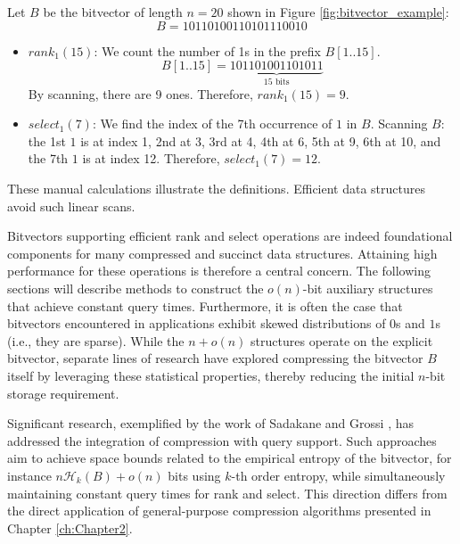 \begin{example}
    Let $B$ be the bitvector of length $n=20$ shown in Figure \ref{fig:bitvector_example}:
    \[ B = 10110100110101110010 \]

    \begin{itemize}
        \item $rank_1(15)$: We count the number of 1s in the prefix $B[1..15]$.
              \[ B[1..15] = \underbrace{101101001101011}_{15 \text{ bits}} \]
              By scanning, there are 9 ones. Therefore, $rank_1(15) = 9$.

        \item $select_1(7)$: We find the index of the 7th occurrence of $1$ in $B$.
              Scanning $B$: the 1st $1$ is at index 1, 2nd at 3, 3rd at 4, 4th at 6, 5th at 9, 6th at 10, and the 7th $1$ is at index 12.
              Therefore, $select_1(7) = 12$.
    \end{itemize}
    These manual calculations illustrate the definitions. Efficient data structures avoid such linear scans.
\end{example}


Bitvectors supporting efficient \textsf{rank} and \textsf{select} operations are indeed foundational components for many compressed and succinct data structures. Attaining high performance for these operations is therefore a central concern. The following sections will describe methods to construct the $o(n)$-bit auxiliary structures that achieve constant query times. Furthermore, it is often the case that bitvectors encountered in applications exhibit skewed distributions of $0$s and $1$s (i.e., they are sparse). While the $n+o(n)$ structures operate on the explicit bitvector, separate lines of research have explored compressing the bitvector $B$ itself by leveraging these statistical properties, thereby reducing the initial $n$-bit storage requirement.

Significant research, exemplified by the work of Sadakane and Grossi \cite{sadakane2006squeezing}, has addressed the integration of compression with query support. Such approaches aim to achieve space bounds related to the empirical entropy of the bitvector, for instance $n\mathcal{H}_k(B) + o(n)$ bits using $k$-th order entropy, while simultaneously maintaining constant query times for \textsf{rank} and \textsf{select}. This direction differs from the direct application of general-purpose compression algorithms presented in Chapter \ref{ch:Chapter2}.

